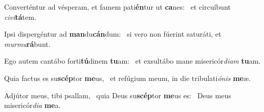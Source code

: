 \item Converténtur ad vésperam, et famem pati\textbf{én}tur ut \textbf{ca}nes:~\psstar{} et circuíbunt \textit{civi}\textbf{tá}tem.
\item Ipsi dispergéntur ad \textbf{man}du\-\textbf{cán}dum:~\psstar{} si vero non fúerint saturáti, et \textit{murmu}\textbf{rá}bunt.
\item Ego autem cantábo forti\textbf{tú}dinem \textbf{tu}am:~\psstar{} et exsultábo mane misericór\textit{diam} \textbf{tu}am.
\item Quia factus es su\textbf{scép}tor \textbf{me}us,~\psstar{} et refúgium meum, in die tribulati\textit{ónis} \textbf{me}æ.
\item Adjútor meus, tibi psallam,~\pscross{} quia Deus su\textbf{scép}tor \textbf{me}us es:~\psstar{} Deus meus misericór\textit{dia} \textbf{me}a.
